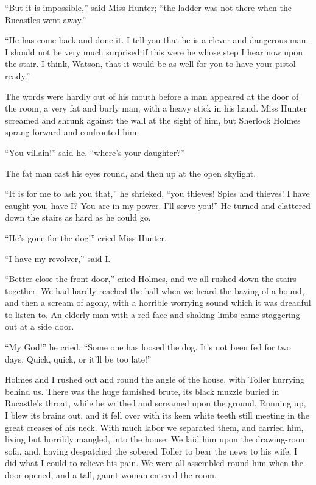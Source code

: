“But it is impossible,” said Miss Hunter; “the ladder was
not there when the Rucastles went away.”

“He has come back and done it. I tell you that he is a
clever and dangerous man. I should not be very much surprised
if this were he whose step I hear now upon the stair.
I think, Watson, that it would be as well for you to have your
pistol ready.”

The words were hardly out of his mouth before a man
appeared at the door of the room, a very fat and burly man,
with a heavy stick in his hand. Miss Hunter screamed and
shrunk against the wall at the sight of him, but Sherlock
Holmes sprang forward and confronted him.

“You villain!” said he, “where’s your daughter?”

The fat man cast his eyes round, and then up at the open
skylight.

“It is for me to ask you that,” he shrieked, “you thieves!
Spies and thieves! I have caught you, have I? You are in
my power. I’ll serve you!” He turned and clattered down
the stairs as hard as he could go.

“He’s gone for the dog!” cried Miss Hunter.

“I have my revolver,” said I.

“Better close the front door,” cried Holmes, and we all
rushed down the stairs together. We had hardly reached the
hall when we heard the baying of a hound, and then a scream
of agony, with a horrible worrying sound which it was dreadful
to listen to. An elderly man with a red face and shaking
limbs came staggering out at a side door.

“My God!” he cried. “Some one has loosed the dog. It’s
not been fed for two days. Quick, quick, or it’ll be too late!”

Holmes and I rushed out and round the angle of the house,
with Toller hurrying behind us. There was the huge famished
brute, its black muzzle buried in Rucastle’s throat, while
he writhed and screamed upon the ground. Running up, I
blew its brains out, and it fell over with its keen white teeth
still meeting in the great creases of his neck. With much
labor we separated them, and carried him, living but horribly
mangled, into the house. We laid him upon the drawing-room
sofa, and, having despatched the sobered Toller to bear the
news to his wife, I did what I could to relieve his pain. We
were all assembled round him when the door opened, and a
tall, gaunt woman entered the room.

